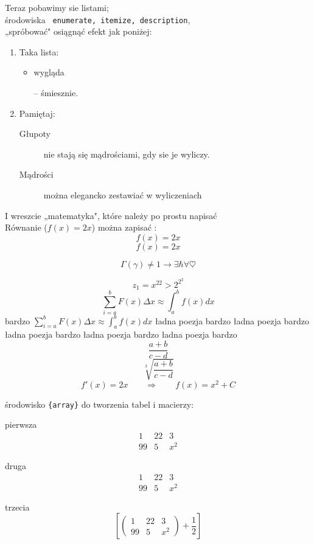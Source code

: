 \documentclass[11pt]{article}
\begin{document}
\vspace*{-3cm}
Teraz pobawimy sie listami;\\ środowiska \verb+ enumerate, itemize, description+,\\
„spróbować" osiągnąć efekt jak poniżej:
\begin{enumerate}\item Taka lista:
\begin{itemize}
\item wygląda
\item[--] śmiesznie.
\end{itemize}
\item Pamiętaj:
\begin{description}
\item[Głupoty] nie stają się mądrościami, gdy sie je wyliczy. 
\item[Mądrości] można elegancko zestawiać w wyliczeniach \end{description}
\end{enumerate}

I wreszcie „matematyka", które należy po prostu napisać\\ 
Równanie ($f(x)=2x$) można zapisać :
\[ f(x)=2x \]
\begin{equation}
f(x)=2x
\end{equation}

$$\Gamma(\gamma)\neq 1\rightarrow \exists \hbar \forall \heartsuit $$

$$z_{1} = x^{22} > 2^{2^2}$$
$$ \sum_{i=a}^b F(x) \Delta x \approx \int_a^b f(x) dx $$ 
bardzo $ \sum_{i=a}^b F(x) \Delta x \approx \int_a^b f(x) dx $
ładna poezja bardzo ładna poezja bardzo ładna poezja bardzo ładna poezja bardzo ładna poezja bardzo
$$\frac{a+b}{c-d}$$ 
$$\sqrt[3]{\frac{a+b}{c-d}}$$
$$f'(x)=2x \hspace{2em} \Rightarrow \hspace{2em} f(x)=x^2+C$$

środowisko \verb+{array}+ do tworzenia tabel i macierzy:

pierwsza
$$
\begin{array}{clr}
1 & 22 & 3 \\ 
99 & 5 & x^2 
\end{array}
$$

druga
$$
\begin{array}{clr}
\hline
1 & 22 & 3 \\ 
\hline
99 & 5 & x^2 
\end{array} $$

trzecia
$$
\left[
\left(
\begin{array}{clr}
1 & 22 & 3 \\
99 & 5 & x^2 
\end{array} 
\right)
+\frac{1}{2} 
\right]
$$
 
\end{document}
